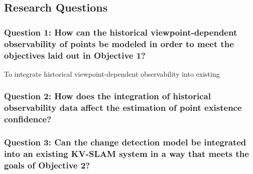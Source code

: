 \subsection{Research Questions}

\subsubsection*{Question 1: How can the historical viewpoint-dependent observability of points be modeled in order to meet the objectives laid out in Objective 1?}

To integrate historical viewpoint-dependent observability into existing 

\subsubsection*{Question 2: How does the integration of historical observability data affect the estimation of point existence confidence?}



\subsubsection*{Question 3: Can the change detection model be integrated into an existing KV-SLAM system in a way that meets the goals of Objective 2?}